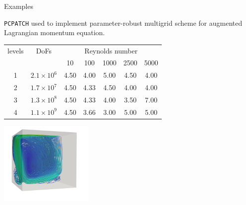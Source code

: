 \documentclass[paperwidth=60in,paperheight=36in,landscape]{baposter}
\begin{document}
\begin{poster}
\begin{posterbox}[name=examples, column=4, span=2, height=0.85]{Examples}
    {\raggedright \texttt{PCPATCH} used to implement parameter-robust multigrid scheme
    for augmented Lagrangian momentum equation.\par}

    \begin{minipage}[c]{0.6\textwidth}
      \strut\vspace*{-\baselineskip}\newline
      \begin{tabular}{cc|ccccc}
        \toprule
        levels & DoFs & \multicolumn{5}{c}{Reynolds number} \\
               && 10 & 100 & 1000 & 2500 & 5000 \\
        \midrule
        1 & $2.1 \times 10^6$ & 4.50 & 4.00 & 5.00 & 4.50 & 4.00 \\
        2 & $1.7 \times 10^7$ & 4.50 & 4.33 & 4.50 & 4.00 & 4.00 \\
        3 & $1.3 \times 10^8$ & 4.50 & 4.33 & 4.00 & 3.50 & 7.00 \\
        4 & $1.1 \times 10^9$ & 4.50 & 3.66 & 3.00 & 5.00 & 5.00 \\
        \bottomrule
      \end{tabular}
    \end{minipage}
    \hfill
    \hspace{0.5em}
    \begin{minipage}[c]{0.4\textwidth}
      \strut\vspace*{-\baselineskip}\newline
      {\centering \includegraphics[height=4cm]{LDC-streamlines}\par}
    \end{minipage}


\end{posterbox}
\end{poster}
\end{document}
